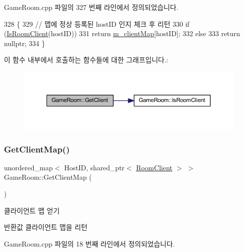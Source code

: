 Game\+Room.\+cpp 파일의 327 번째 라인에서 정의되었습니다.


\begin{DoxyCode}
328 \{ 
329     \textcolor{comment}{// 맵에 정상 등록된 hostID 인지 체크 후 리턴}
330     \textcolor{keywordflow}{if} (\hyperlink{class_game_room_a48687c02109ec932166223aa144c8c1f}{IsRoomClient}(hostID))
331         \textcolor{keywordflow}{return} \hyperlink{class_game_room_afc202a511605453216f7dd870ff96c5c}{m\_clientMap}[hostID];
332     \textcolor{keywordflow}{else}
333         \textcolor{keywordflow}{return} \textcolor{keyword}{nullptr};
334 \}
\end{DoxyCode}
이 함수 내부에서 호출하는 함수들에 대한 그래프입니다.\+:\nopagebreak
\begin{figure}[H]
\begin{center}
\leavevmode
\includegraphics[width=350pt]{class_game_room_af9eed2640f6fe818e1528d997895f8d6_cgraph}
\end{center}
\end{figure}
\mbox{\label{class_game_room_ae59443257f14fe5ef17c542981e65f3f}} 
\subsubsection{\texorpdfstring{Get\+Client\+Map()}{GetClientMap()}}
{\footnotesize\ttfamily unordered\+\_\+map$<$ Host\+ID, shared\+\_\+ptr$<$ \hyperlink{class_room_client}{Room\+Client} $>$ $>$ Game\+Room\+::\+Get\+Client\+Map (\begin{DoxyParamCaption}{ }\end{DoxyParamCaption})}



클라이언트 맵 얻기 

\begin{DoxyReturn}{반환값}
클라이언트 맵을 리턴 
\end{DoxyReturn}


Game\+Room.\+cpp 파일의 18 번째 라인에서 정의되었습니다.


